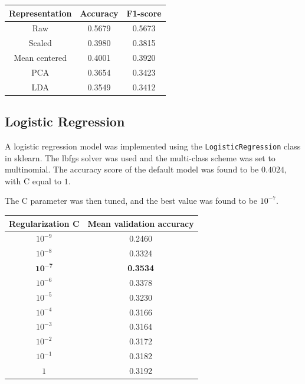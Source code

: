\documentclass[12pt]{article}
\begin{document}
\begin{center}
  \begin{tabular}{|c|c|c|}
    \hline
    Representation & Accuracy & F1-score \\
    \hline
    Raw & 0.5679 & 0.5673\\
    Scaled & 0.3980 & 0.3815\\
    Mean centered & 0.4001 & 0.3920\\
    PCA & 0.3654 & 0.3423\\
    LDA & 0.3549 & 0.3412 \\
    \hline
  \end{tabular}
\end{center}

\subsection*{Logistic Regression}

A logistic regression model was implemented using the \texttt{LogisticRegression} class in sklearn. The lbfgs solver was used and the multi-class scheme was set to multinomial. The accuracy score of the default model was found to be $0.4024$, with C equal to $1$.

The C parameter was then tuned, and the best value was found to be $10^{-7}$.

\begin{center}
\begin{tabular}{|c|c|}
 \hline
 Regularization C& Mean validation accuracy \\
 \hline
  $10^{-9}$& 0.2460\\
 $10^{-8}$ & 0.3324\\
 $\mathbf{10^{-7}}$ & \textbf{0.3534}\\
 $10^{-6}$ & 0.3378\\
 $10^{-5}$ & 0.3230\\
 $10^{-4}$ & 0.3166\\
 $10^{-3}$ & 0.3164\\
 $10^{-2}$ & 0.3172\\
 $10^{-1}$ & 0.3182\\
 $1$ & 0.3192\\
 \hline
\end{tabular}
\end{center}
\end{document}

